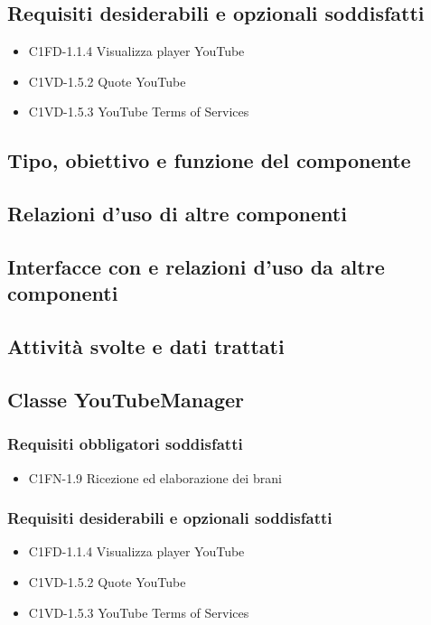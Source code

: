 \subsection*{Requisiti desiderabili e opzionali soddisfatti}
\begin{itemize}
    \item C1FD-1.1.4 Visualizza player YouTube
    \item C1VD-1.5.2 Quote YouTube
    \item C1VD-1.5.3 YouTube Terms of Services
\end{itemize}
\subsection*{Tipo, obiettivo e funzione del componente}
\subsection*{Relazioni d'uso di altre componenti}
\subsection*{Interfacce con e relazioni d'uso da altre componenti}
\subsection*{Attivit\`a svolte e dati trattati}

\subsection{Classe YouTubeManager}
\subsubsection*{Requisiti obbligatori soddisfatti}
\begin{itemize}
    \item C1FN-1.9 Ricezione ed elaborazione dei brani
\end{itemize}
\subsubsection*{Requisiti desiderabili e opzionali soddisfatti}
\begin{itemize}
    \item C1FD-1.1.4 Visualizza player YouTube
    \item C1VD-1.5.2 Quote YouTube
    \item C1VD-1.5.3 YouTube Terms of Services
\end{itemize}
